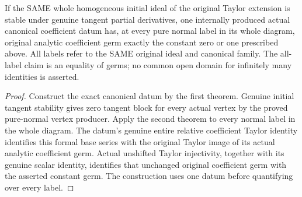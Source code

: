 \begin{theorem}
\label{hir:actual-canonical-analytic-normal-diagram-support}
\leanok
If the SAME whole homogeneous initial ideal of the original Taylor extension
is stable under genuine tangent partial derivatives, one internally produced
actual canonical coefficient datum has, at every pure normal label in its
whole diagram, original analytic coefficient germ exactly the constant zero
or one prescribed above. All labels refer to the SAME original ideal and
canonical family. The all-label claim is an equality of germs; no common
open domain for infinitely many identities is asserted.
\end{theorem}
\begin{proof}
Construct the exact canonical datum by the first theorem. Genuine initial
tangent stability gives zero tangent block for every actual vertex by the
proved pure-normal vertex producer. Apply the second theorem to every normal
label in the whole diagram. The datum's genuine entire relative coefficient
Taylor identity identifies this formal base series with the original Taylor
image of its actual analytic coefficient germ. Actual unshifted Taylor
injectivity, together with its genuine scalar identity, identifies that
unchanged original coefficient germ with the asserted constant germ. The
construction uses one datum before quantifying over every label.
\end{proof}

